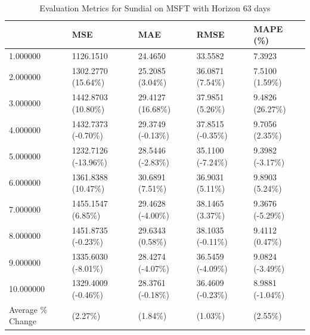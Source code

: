 \begin{table}
\caption{Evaluation Metrics for Sundial on MSFT with Horizon 63 days}
\label{tab:sundial_MSFT_h63_metrics}
\begin{tabular}{lllll}
\toprule
 & MSE & MAE & RMSE & MAPE (\%) \\
\midrule
1.000000 & 1126.1510 & 24.4650 & 33.5582 & 7.3923 \\
2.000000 & 1302.2770 (15.64\%) & 25.2085 (3.04\%) & 36.0871 (7.54\%) & 7.5100 (1.59\%) \\
3.000000 & 1442.8703 (10.80\%) & 29.4127 (16.68\%) & 37.9851 (5.26\%) & 9.4826 (26.27\%) \\
4.000000 & 1432.7373 (-0.70\%) & 29.3749 (-0.13\%) & 37.8515 (-0.35\%) & 9.7056 (2.35\%) \\
5.000000 & 1232.7126 (-13.96\%) & 28.5446 (-2.83\%) & 35.1100 (-7.24\%) & 9.3982 (-3.17\%) \\
6.000000 & 1361.8388 (10.47\%) & 30.6891 (7.51\%) & 36.9031 (5.11\%) & 9.8903 (5.24\%) \\
7.000000 & 1455.1547 (6.85\%) & 29.4628 (-4.00\%) & 38.1465 (3.37\%) & 9.3676 (-5.29\%) \\
8.000000 & 1451.8735 (-0.23\%) & 29.6343 (0.58\%) & 38.1035 (-0.11\%) & 9.4112 (0.47\%) \\
9.000000 & 1335.6030 (-8.01\%) & 28.4274 (-4.07\%) & 36.5459 (-4.09\%) & 9.0824 (-3.49\%) \\
10.000000 & 1329.4009 (-0.46\%) & 28.3761 (-0.18\%) & 36.4609 (-0.23\%) & 8.9881 (-1.04\%) \\
Average \% Change & (2.27\%) & (1.84\%) & (1.03\%) & (2.55\%) \\
\bottomrule
\end{tabular}
\end{table}
